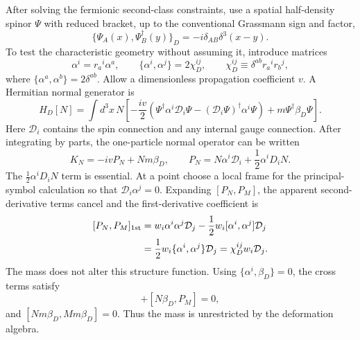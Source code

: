 \documentclass[11pt]{article}
\begin{document}
After solving the fermionic second-class constraints, use a spatial half-density spinor $\Psi$ with reduced bracket, up to the conventional Grassmann sign and factor,
\begin{equation}
    \{\Psi_A(x),\Psi_B^\dagger(y)\}_D
    =-i\delta_{AB}\delta^3(x-y).
\end{equation}
To test the characteristic geometry without assuming it, introduce matrices
\begin{equation}
    \alpha^i=r_a{}^i\alpha^a,
    \qquad
    \{\alpha^i,\alpha^j\}=2\chi_D^{ij},
    \qquad
    \chi_D^{ij}\equiv\delta^{ab}r_a{}^ir_b{}^j,
\end{equation}
where $\{\alpha^a,\alpha^b\}=2\delta^{ab}$. Allow a dimensionless propagation coefficient $v$. A Hermitian normal generator is
\begin{equation}
\boxed{
H_D[N]=\int d^3x\,N\left[
-\frac{iv}{2}\left(
\Psi^\dagger\alpha^i\mathcal D_i\Psi
-(\mathcal D_i\Psi)^\dagger\alpha^i\Psi
\right)
+m\Psi^\dagger\beta_D\Psi
\right].}
\label{eq:Dirac_trial_H}
\end{equation}
Here $\mathcal D_i$ contains the spin connection and any internal gauge connection. After integrating by parts, the one-particle normal operator can be written
\begin{equation}
    K_N=-ivP_N+Nm\beta_D,
    \qquad
    P_N=N\alpha^i\mathcal D_i+\frac12\alpha^iD_iN.
    \label{eq:Dirac_PN}
\end{equation}
The $\frac12\alpha^iD_iN$ term is essential. At a point choose a local frame for the principal-symbol calculation so that $\mathcal D_i\alpha^j=0$. Expanding $[P_N,P_M]$, the apparent second-derivative terms cancel and the first-derivative coefficient is
\begin{equation}
\begin{aligned}
[P_N,P_M]_{\rm 1st}
&=w_i\alpha^i\alpha^j\mathcal D_j
-\frac12w_i[\alpha^i,\alpha^j]\mathcal D_j\\
&=\frac12w_i\{\alpha^i,\alpha^j\}\mathcal D_j
=\chi_D^{ij}w_i\mathcal D_j.
\end{aligned}
\label{eq:Dirac_principal_bracket}
\end{equation}
The mass does not alter this structure function. Using $\{\alpha^i,\beta_D\}=0$, the cross terms satisfy
\begin{equation}
    [P_N,M\beta_D]+[N\beta_D,P_M]=0,
    \label{eq:Dirac_mass_cancel}
\end{equation}
and $[Nm\beta_D,Mm\beta_D]=0$. Thus the mass is unrestricted by the deformation algebra.
\end{document}
